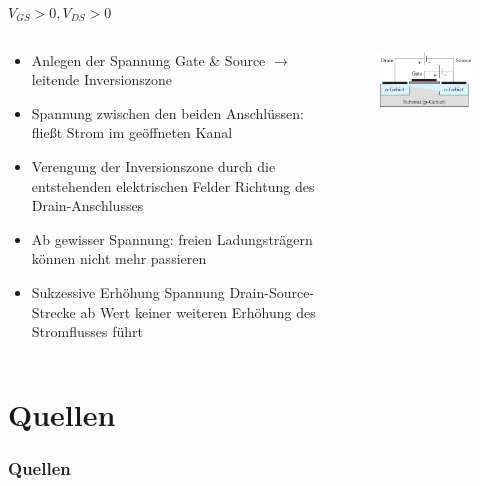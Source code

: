 \documentclass[12pt%
,aspectratio=169%
]{beamer}
\begin{document}
\begin{frame}{$V_{GS} > 0, V_{DS} > 0$}
\begin{columns}[T] %
\begin{column}{.62\textwidth}
	\begin{itemize}
		\item Anlegen der Spannung Gate \& Source $\to$ leitende Inversionszone
		\item Spannung zwischen den beiden Anschlüssen: fließt Strom im geöffneten Kanal
		\item Verengung der Inversionszone durch die entstehenden elektrischen Felder Richtung des Drain-Anschlusses
		\item Ab gewisser Spannung: freien Ladungsträgern können nicht mehr passieren
		\item Sukzessive Erhöhung Spannung Drain-Source-Strecke ab Wert keiner weiteren Erhöhung des Stromflusses führt
	\end{itemize}
\end{column}%
\hfill%
\begin{column}{.38\textwidth}
\begin{figure}
\center
\includegraphics[scale=0.5]{pictures/fall3}\\
\end{figure}
\end{column}%
\end{columns}
\end{frame}


\section*{Quellen}
\appendix
\begin{frame}[allowframebreaks]
  \frametitle<presentation>{Quellen}
\printbibliography
\end{frame}
\end{document}
